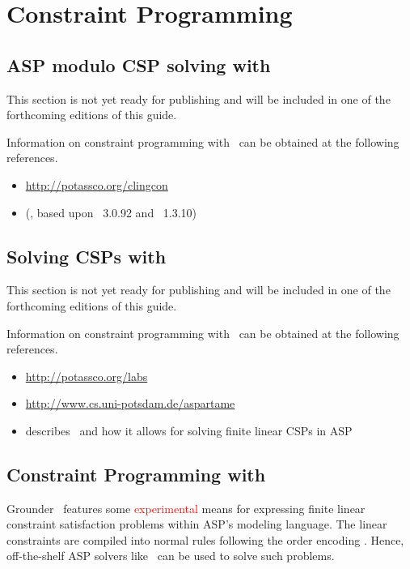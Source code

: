 \section{Constraint Programming}\label{sec:constraint}

\subsection{ASP modulo CSP solving with \clingcon}
\label{sec:clingcon}

This section is not yet ready for publishing
and will be included in one of the forthcoming editions of this guide.

Information on constraint programming with \clingcon\ can be obtained at the following references.

\begin{itemize}
\item \url{http://potassco.org/clingcon}
\item \cite{geossc09a,ostsch12a} (\clingcon, based upon \gringo~3.0.92 and \clasp~1.3.10)
\end{itemize}

\subsection{Solving CSPs with \aspartame}
\label{sec:aspartame}

This section is not yet ready for publishing
and will be included in one of the forthcoming editions of this guide.

Information on constraint programming with \aspartame\ can be obtained at the following references.

\begin{itemize}
\item \url{http://potassco.org/labs}
\item \url{http://www.cs.uni-potsdam.de/aspartame}
\item \cite{bageinscsotawe13a} describes \aspartame\ and how it allows for solving finite linear CSPs in ASP
\end{itemize}

\subsection{Constraint Programming with \gringo}

Grounder \gringo\ features some \textcolor{red}{experimental} means for expressing finite linear constraint satisfaction problems within ASP's modeling language.
The linear constraints are compiled into normal rules following the order encoding \cite{tatakiba09a,bageinscsotawe13a}.
Hence, off-the-shelf ASP solvers like \clasp\ can be used to solve such problems.


